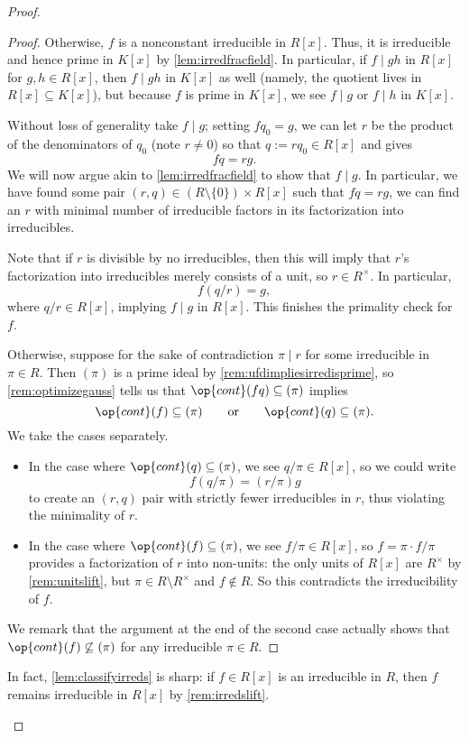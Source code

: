 \begin{proof}
\begin{proof}
		Otherwise, $f$ is a nonconstant irreducible in $R[x]$. Thus, it is irreducible and hence prime in $K[x]$ by \autoref{lem:irredfracfield}. In particular, if $f\mid gh$ in $R[x]$ for $g,h\in R[x]$, then $f\mid gh$ in $K[x]$ as well (namely, the quotient lives in $R[x]\subseteq K[x]$), but because $f$ is prime in $K[x]$, we see $f\mid g$ or $f\mid h$ in $K[x]$.

		Without loss of generality take $f\mid g$; setting $fq_0=g$, we can let $r$ be the product of the denominators of $q_0$ (note $r\ne0$) so that $q:=rq_0\in R[x]$ and gives
		\[fq=rg.\]
		We will now argue akin to \autoref{lem:irredfracfield} to show that $f\mid g$. In particular, we have found some pair $(r,q)\in(R\setminus\{0\})\times R[x]$ such that $fq=rg$, we can find an $r$ with minimal number of irreducible factors in its factorization into irreducibles.

		Note that if $r$ is divisible by no irreducibles, then this will imply that $r$'s factorization into irreducibles merely consists of a unit, so $r\in R^\times$. In particular,
		\[f(q/r)=g,\]
		where $q/r\in R[x]$, implying $f\mid g$ in $R[x]$. This finishes the primality check for $f$.

		Otherwise, suppose for the sake of contradiction $\pi\mid r$ for some irreducible in $\pi\in R$. Then $(\pi)$ is a prime ideal by \autoref{rem:ufdimpliesirredisprime}, so \autoref{rem:optimizegauss} tells us that $\op{cont}(fq)\subseteq(\pi)$ implies
		\[\op{cont}(f)\subseteq(\pi)\qquad\text{or}\qquad\op{cont}(q)\subseteq(\pi).\]
		We take the cases separately.
		\begin{itemize}
			\item In the case where $\op{cont}(q)\subseteq(\pi)$, we see $q/\pi\in R[x]$, so we could write
			\[f(q/\pi)=(r/\pi)g\]
			to create an $(r,q)$ pair with strictly fewer irreducibles in $r$, thus violating the minimality of $r$.
			\item In the case where $\op{cont}(f)\subseteq(\pi)$, we see $f/\pi\in R[x]$, so $f=\pi\cdot f/\pi$ provides a factorization of $r$ into non-units: the only units of $R[x]$ are $R^\times$ by \autoref{rem:unitslift}, but $\pi\in R\setminus R^\times$ and $f\notin R$. So this contradicts the irreducibility of $f$.
		\end{itemize}
		We remark that the argument at the end of the second case actually shows that $\op{cont}(f)\not\subseteq(\pi)$ for any irreducible $\pi\in R$.
	\end{proof}
	\begin{remark}[Nir] \label{rem:classifyirreds}
		In fact, \autoref{lem:classifyirreds} is sharp: if $f\in R[x]$ is an irreducible in $R$, then $f$ remains irreducible in $R[x]$ by \autoref{rem:irredslift}.
		

\end{remark}
\end{proof}
